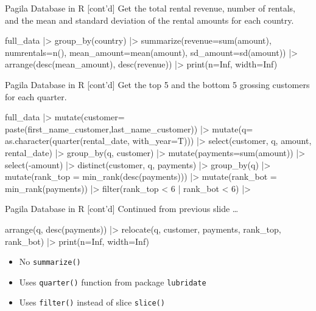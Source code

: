 \documentclass[ignorenonframetext,xcolor=x11names]{beamer}
\begin{document}
\begin{frame}[label=full,fragile]{Pagila Database in R \small [cont'd]}
Get the total rental revenue, number of rentals, and the mean and standard deviation of the rental amounts for each country.

\footnotesize
\begin{Rcode}
full_data |>
  group_by(country) |>
  summarize(revenue=sum(amount), 
            numrentals=n(),
            mean_amount=mean(amount),
            sd_amount=sd(amount)) |>
  arrange(desc(mean_amount),
          desc(revenue)) |>
  print(n=Inf, width=Inf)  
\end{Rcode}
\normalsize
\end{frame}

\begin{frame}[label=full,fragile]{Pagila Database in R \small [cont'd]}
Get the top 5 and the bottom 5 grossing customers for each quarter.

\footnotesize
\begin{Rcode}
full_data |>
  mutate(customer=
   paste(first_name_customer,last_name_customer)) |>
  mutate(q=
   as.character(quarter(rental_date, with_year=T))) |>
  select(customer, q, amount, rental_date) |>
  group_by(q, customer) |>
  mutate(payments=sum(amount)) |>
  select(-amount) |>
  distinct(customer, q, payments) |>
  group_by(q) |>
  mutate(rank_top = min_rank(desc(payments))) |>
  mutate(rank_bot = min_rank(payments)) |>
  filter(rank_top < 6 | rank_bot < 6) |>
\end{Rcode}
\end{frame}

\begin{frame}[label=full,fragile]{Pagila Database in R \small [cont'd]}
Continued from previous slide \ldots

\footnotesize
\begin{Rcode}
  arrange(q, desc(payments)) |>
  relocate(q, customer, payments, 
              rank_top, rank_bot) |>
  print(n=Inf, width=Inf)
\end{Rcode}
\normalsize
\begin{itemize}
  \item No \texttt{summarize()}
  \item Uses \texttt{quarter()} function from package \texttt{lubridate}
  \item Uses \texttt{filter()} instead of slice \texttt{slice()}
\end{itemize}
\end{frame}
\end{document}
